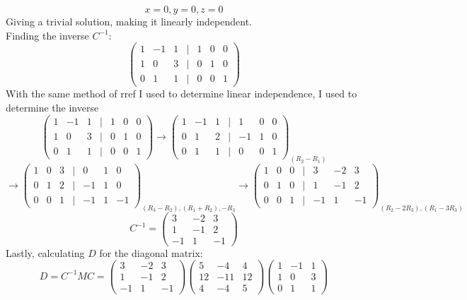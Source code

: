 \documentclass[11pt]{article}
\begin{document}
\[x=0, y=0, z=0\]
Giving a trivial solution, making it linearly independent.\\
Finding the inverse $C^{-1}$:
\[
\begin{pmatrix}
1 & -1 & 1 & | & 1 & 0 & 0\\
1 & 0 & 3 & | & 0 & 1 & 0\\
0 & 1 & 1 & | & 0 & 0 & 1
\end{pmatrix}\]
With the same method of rref I used to determine linear independence, I used to determine the inverse
\[\begin{pmatrix}
1 & -1 & 1 & | & 1 & 0 & 0\\
1 & 0 & 3 & | & 0 & 1 & 0\\
0 & 1 & 1 & | & 0 & 0 & 1
\end{pmatrix} \rightarrow 
\begin{pmatrix}
1 & -1 & 1 & | & 1 & 0 & 0\\
0 & 1 & 2 & | & -1 & 1 & 0\\
0 & 1 & 1 & | & 0 & 0 & 1
\end{pmatrix}_{(R_2-R_1)} \]
\[\rightarrow 
\begin{pmatrix}
1 & 0 & 3 & | & 0 & 1 & 0\\
0 & 1 & 2 & | & -1 & 1 & 0\\
0 & 0 & 1 & | & -1 & 1 & -1
\end{pmatrix}_{(R_3-R_2), (R_1+R_2), -R_3}\rightarrow 
\begin{pmatrix}
1 & 0 & 0 & | & 3 & -2 & 3\\
0 & 1 & 0 & | & 1 & -1 & 2\\
0 & 0 & 1 & | & -1 & 1 & -1
\end{pmatrix}_{(R_2-2R_3), (R_1-3R_3)}\]
\[C^{-1}=
\begin{pmatrix}
3 & -2 & 3\\
1 & -1 & 2\\
-1 & 1 & -1
\end{pmatrix}\]
Lastly, calculating $D$ for the diagonal matrix:
\[D=C^{-1}MC=
\begin{pmatrix}
3 & -2 & 3\\
1 & -1 & 2\\
-1 & 1 & -1
\end{pmatrix}
\begin{pmatrix}
5 & -4 & 4\\
12 & -11 & 12\\
4 & -4 & 5
\end{pmatrix}
\begin{pmatrix}
1 & -1 & 1\\
1 & 0 & 3\\
0 & 1 & 1
\end{pmatrix}\]
\end{document}
